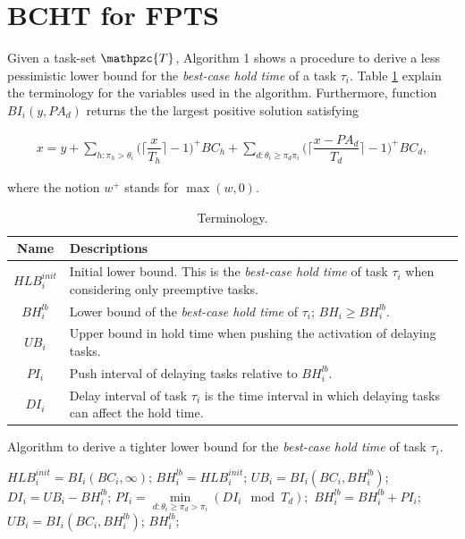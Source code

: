 \documentclass[fleqn]{article}
\begin{document}
\section{BCHT for FPTS}

Given a task-set $\mathpzc{T}$, Algorithm 1 shows a procedure to derive a less pessimistic lower bound for the \textit{best-case hold time} of a task $\tau_i$. Table \ref{tab:terminology} explain the terminology for the variables used in the algorithm. Furthermore, function $BI_i(y,PA_d)$ returns the the largest positive solution satisfying

\begin{align}
x = y + \sum\limits_{h:\pi_h > \theta_i} \Big( \Big\lceil  \dfrac{x}{T_h}\Big\rceil -1 \Big)^+  BC_h + \sum\limits_{d:\theta_i \geq \pi_d \pi_i} \Big( \Big\lceil  \dfrac{x-PA_d}{T_d}\Big\rceil -1 \Big)^+  BC_d,
\end{align}

\noindent
where the notion $w^+$ stands for $\max(w,0)$.

\begin{table}[H]
	\center
	\caption{Terminology.}
	\label{tab:terminology}
	\begin{tabular}{|c | p{9cm}|}
		\hline
		Name & Descriptions \\ 
		\hline 
		\hline
		$HLB^{init}_i$& Initial lower bound. This is the \textit{best-case hold time} of task $\tau_i$ when considering only preemptive tasks.\\
		\hline
		$BH^{lb}_i$& Lower bound of the \textit{best-case hold time} of $\tau_i$; $BH_i \geq BH^{lb}_i.$\\
		\hline
		$UB_i$& Upper bound in hold time when pushing the activation of delaying tasks. \\ 
		\hline
		$PI_i$ & Push interval of delaying tasks relative to $BH^{lb}_i$.   \\ 
		\hline
		$DI_i$ & Delay interval of task $\tau_i$ is the time interval in which delaying tasks can affect the hold time.\\
		\hline 
	\end{tabular}
\end{table} 

\begin{algorithm}[H]
	\caption{Algorithm to derive a tighter lower bound for the \textit{best-case hold time} of task $\tau_i$.}\label{euclid}
	\begin{algorithmic}[1]
		\State $HLB^{init}_i = BI_i(BC_i,\infty)$;
		\State $BH^{lb}_i = HLB^{init}_i$;
		\State $UB_i = BI_i(BC_i,BH^{lb}_i)$;
		\State $DI_i = UB_i - BH^{lb}_i$;
		\State $PI_i = \min \limits_{d:\theta_i \geq \pi_d > \pi_i} (DI_i \mod T_d);$
		\State $BH^{lb}_i = BH^{lb}_i + PI_i$;
		\State $UB_i = BI_i(BC_i,BH^{lb}_i)$;
		\State \Return $BH^{lb}_i$; 
		\EndProcedure
	\end{algorithmic}
\end{algorithm}
\end{document}
